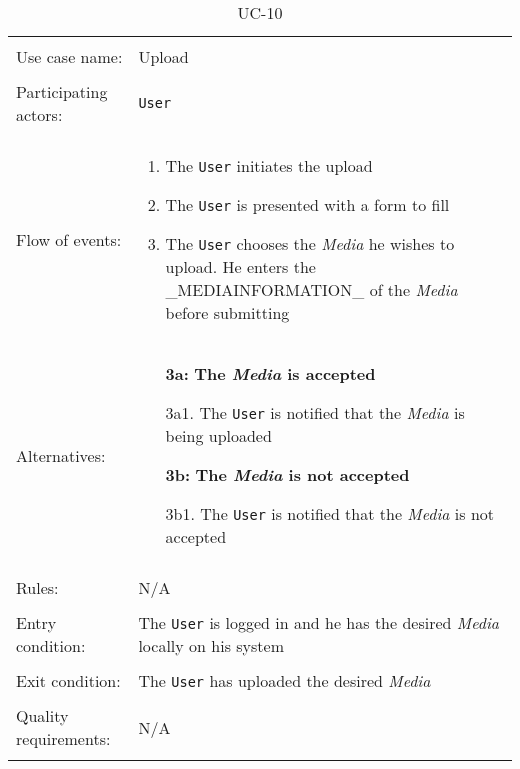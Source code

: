 \documentclass[../report.tex]{subfiles}
\begin{document}
\noindent
\begin{table}
\caption{UC-10}
\label{UC-10}
\begin{tabular}{ l p{8cm} } 
\hline  
\\                   
Use case name:  & Upload   \\   \hline \\               
Participating actors:  & \texttt{User} \\   \hline \\         
Flow of events: & \begin{enumerate}
\item{The \texttt{User} initiates the upload}
\item{The \texttt{User} is presented with a form to fill}
\item{The \texttt{User} chooses the \textit{Media} he wishes to upload. He enters the \_MEDIAINFORMATION\_ of the \textit{Media} before submitting}
\end{enumerate} \\
Alternatives: & \begin{itemize}
\item[\textbf{3a:}] \textbf{The \textit{Media} is accepted}
\item[]  3a1. The \texttt{User} is notified that the \textit{Media} is being uploaded
\item[\textbf{3b:}] \textbf{The \textit{Media} is not accepted}
\item[]  3b1. The \texttt{User} is notified that the \textit{Media} is not accepted
\end{itemize}
\\   \hline \\
Rules: & N/A \\ \hline \\
Entry condition: & The \texttt{User} is logged in and he has the desired \textit{Media} locally on his system \\ \hline \\
Exit condition: & The \texttt{User} has uploaded the desired \textit{Media} \\ \hline \\
Quality requirements: & N/A \\ \hline \\
\end{tabular} \\
\end{table}
\end{document}
